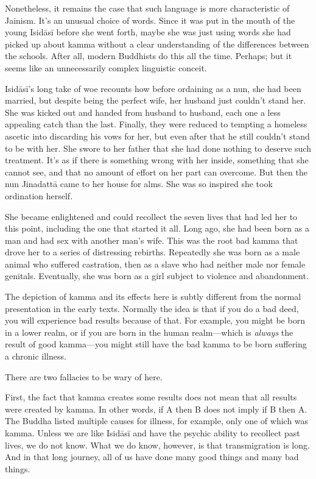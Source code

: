 \documentclass[12pt,openany]{book}%
\begin{document}
Nonetheless, it remains the case that such language is more characteristic of Jainism. It’s an unusual choice of words. Since it was put in the mouth of the young \textsanskrit{Isidāsī} before she went forth, maybe she was just using words she had picked up about kamma without a clear understanding of the differences between the schools. After all, modern Buddhists do this all the time. Perhaps; but it seems like an unnecessarily complex linguistic conceit.

\textsanskrit{Isidāsī}’s long take of woe recounts how before ordaining as a nun, she had been married, but despite being the perfect wife, her husband just couldn’t stand her. She was kicked out and handed from husband to husband, each one a less appealing catch than the last. Finally, they were reduced to tempting a homeless ascetic into discarding his vows for her, but even after that he still couldn’t stand to be with her. She swore to her father that she had done nothing to deserve such treatment. It’s as if there is something wrong with her inside, something that she cannot see, and that no amount of effort on her part can overcome. But then the nun \textsanskrit{Jinadattā} came to her house for alms. She was so inspired she took ordination herself.

She became enlightened and could recollect the seven lives that had led her to this point, including the one that started it all. Long ago, she had been born as a man and had sex with another man’s wife. This was the root bad kamma that drove her to a series of distressing rebirths. Repeatedly she was born as a male animal who suffered castration, then as a slave who had neither male nor female genitals. Eventually, she was born as a girl subject to violence and abandonment.

The depiction of kamma and its effects here is subtly different from the normal presentation in the early texts. Normally the idea is that if you do a bad deed, you will experience bad results because of that. For example, you might be born in a lower realm, or if you are born in the human realm—which is \emph{always} the result of good kamma—you might still have the bad kamma to be born suffering a chronic illness.

There are two fallacies to be wary of here.

First, the fact that kamma creates some results does not mean that all results were created by kamma. In other words, if A then B does not imply if B then A. The Buddha listed multiple causes for illness, for example, only one of which was kamma. Unless we are like \textsanskrit{Isidāsī} and have the psychic ability to recollect past lives, we do not know. What we do know, however, is that transmigration is long. And in that long journey, all of us have done many good things and many bad things.
\end{document}

